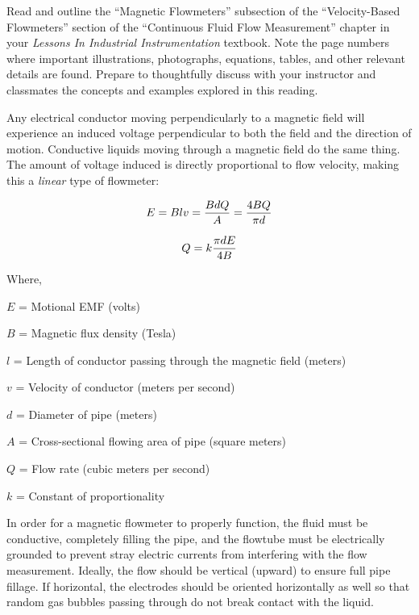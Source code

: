 

Read and outline the ``Magnetic Flowmeters'' subsection of the ``Velocity-Based Flowmeters'' section of the ``Continuous Fluid Flow Measurement'' chapter in your {\it Lessons In Industrial Instrumentation} textbook.  Note the page numbers where important illustrations, photographs, equations, tables, and other relevant details are found.  Prepare to thoughtfully discuss with your instructor and classmates the concepts and examples explored in this reading.














Any electrical conductor moving perpendicularly to a magnetic field will experience an induced voltage perpendicular to both the field and the direction of motion.  Conductive liquids moving through a magnetic field do the same thing.  The amount of voltage induced is directly proportional to flow velocity, making this a {\it linear} type of flowmeter:

$$E = Blv = {B d Q \over A} = {4 B Q \over \pi d}$$

$$Q = k {\pi d E \over 4B}$$

\noindent
Where,

$E$ = Motional EMF (volts)

$B$ = Magnetic flux density (Tesla)

$l$ = Length of conductor passing through the magnetic field (meters)

$v$ = Velocity of conductor (meters per second)

$d$ = Diameter of pipe (meters)

$A$ = Cross-sectional flowing area of pipe (square meters)

$Q$ = Flow rate (cubic meters per second)

$k$ = Constant of proportionality

\vskip 10pt

In order for a magnetic flowmeter to properly function, the fluid must be conductive, completely filling the pipe, and the flowtube must be electrically grounded to prevent stray electric currents from interfering with the flow measurement.  Ideally, the flow should be vertical (upward) to ensure full pipe fillage.  If horizontal, the electrodes should be oriented horizontally as well so that random gas bubbles passing through do not break contact with the liquid.

